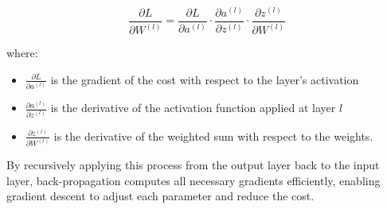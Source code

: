 \begin{equation}
\frac{\partial L}{\partial W^{(l)}} = \frac{\partial L}{\partial a^{(l)}} \cdot \frac{\partial a^{(l)}}{\partial z^{(l)}} \cdot \frac{\partial z^{(l)}}{\partial W^{(l)}}
\end{equation}

where:
\begin{itemize}[label=--]
    \item $\frac{\partial L}{\partial a^{(l)}}$ is the gradient of the cost with respect to the layer’s activation
    \item $\frac{\partial a^{(l)}}{\partial z^{(l)}}$ is the derivative of the activation function applied at layer $l$
    \item $\frac{\partial z^{(l)}}{\partial W^{(l)}}$ is the derivative of the weighted sum with respect to the weights.
\end{itemize}

By recursively applying this process from the output layer back to the input layer, back-propagation computes all necessary gradients efficiently, enabling gradient descent to adjust each parameter and reduce the cost.





